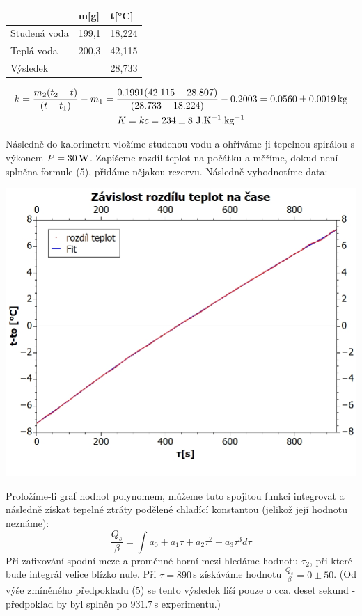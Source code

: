 \documentclass[czech,11pt,a4paper]{article}
\begin{document}
	\begin{center}
			\begin{tabular}{l|l|l}
			& \multicolumn{1}{l|}{m{[}g{]}} & t{[}°C{]} \\ \hline
			Studená voda & \multicolumn{1}{l|}{199,1}    & 18,224      \\ \hline
			Teplá voda   & \multicolumn{1}{l|}{200,3}    & 42,115      \\ \hline
			Výsledek     &                               &    28,733      
		\end{tabular}
		
	
			\begin{gather*}
			k = \frac {m_2 (t_2-t)}{(t-t_1)} - m_1 = \frac {0.1991(42.115-28.807)}{(28.733-18.224)} - 0.2003 = 0.0560 \pm 0.0019 \,\rm kg\\
			K = kc = 234 \pm 8 \,\,\rm J.K^{-1}.kg^{-1}
		\end{gather*}
	
	
	\end{center}
	Následně do kalorimetru vložíme studenou vodu a ohříváme ji tepelnou spirálou s výkonem $P = 30 \,\rm W$. Zapíšeme rozdíl teplot na počátku a měříme, dokud není splněna formule (5), přidáme nějakou rezervu. Následně vyhodnotíme data:
	
	\begin{center}
		
		\includegraphics[width=0.6\linewidth, ]{ts} 
	\end{center}
	
	Proložíme-li graf hodnot polynomem, můžeme tuto spojitou funkci integrovat a následně získat tepelné ztráty podělené chladící konstantou (jelikož její hodnotu neznáme):
	\begin{equation}
		\frac{Q_s}{\beta} = \int a_0 + a_1 \tau + a_2 \tau ^2 + a_3 \tau ^3 d \tau 
	\end{equation}
	Při zafixování spodní meze a proměnné horní mezi hledáme hodnotu $\tau _2$, při které bude integrál velice blízko nule. Při $\tau = 890\, $s získáváme hodnotu $\frac{Q_s}{\beta} = 0 \pm 50$. (Od výše zmíněného předpokladu (5) se tento výsledek liší pouze o cca. deset sekund - předpoklad by byl splněn po $931.7\,$s experimentu.)
	
\end{document}
